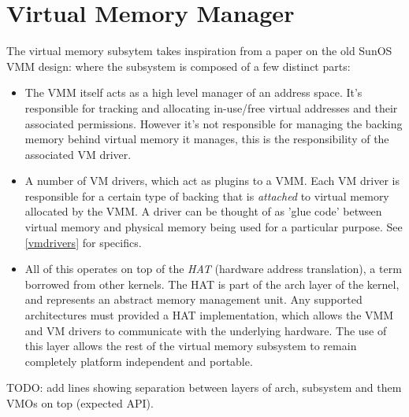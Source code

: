\section{Virtual Memory Manager}
The virtual memory subsytem takes inspiration from a paper on the old SunOS VMM design: where the subsystem is composed of a few distinct parts:

\begin{itemize}
    \item The VMM itself acts as a high level manager of an address space. It's responsible for tracking and allocating in-use/free virtual addresses and their associated permissions. However it's not responsible for managing the backing memory behind virtual memory it manages, this is the responsibility of the associated VM driver.
    \item A number of VM drivers, which act as plugins to a VMM. Each VM driver is responsible for a certain type of backing that is \textit{attached} to virtual memory allocated by the VMM. A driver can be thought of as 'glue code' between virtual memory and physical memory being used for a particular purpose. See \autoref{vmdrivers} for specifics.
    \item All of this operates on top of the \textit{HAT} (hardware address translation), a term borrowed from other kernels. The HAT is part of the arch layer of the kernel, and represents an abstract memory management unit. Any supported architectures must provided a HAT implementation, which allows the VMM and VM drivers to communicate with the underlying hardware. The use of this layer allows the rest of the virtual memory subsystem to remain completely platform independent and portable.
\end{itemize}

TODO: add lines showing separation between layers of arch, subsystem and them VMOs on top (expected API).

